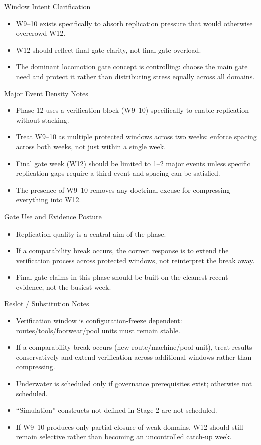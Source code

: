 \documentclass[10pt]{article}
\begin{document}
Window Intent Clarification

\begin{itemize}
\item W9–10 exists specifically to absorb replication pressure that would otherwise overcrowd W12.
\item W12 should reflect final-gate clarity, not final-gate overload.
\item The dominant locomotion gate concept is controlling: choose the main gate need and protect it rather than distributing stress equally across all domains.
\end{itemize}

Major Event Density Notes

\begin{itemize}
\item Phase 12 uses a verification block (W9–10) specifically to enable replication without stacking.
\item Treat W9–10 as multiple protected windows across two weeks: enforce spacing across both weeks, not just within a single week.
\item Final gate week (W12) should be limited to 1–2 major events unless specific replication gaps require a third event and spacing can be satisfied.
\item The presence of W9–10 removes any doctrinal excuse for compressing everything into W12.
\end{itemize}

Gate Use and Evidence Posture

\begin{itemize}
\item Replication quality is a central aim of the phase.
\item If a comparability break occurs, the correct response is to extend the verification process across protected windows, not reinterpret the break away.
\item Final gate claims in this phase should be built on the cleanest recent evidence, not the busiest week.
\end{itemize}

Reslot / Substitution Notes

\begin{itemize}
\item Verification window is configuration-freeze dependent: routes/tools/footwear/pool units must remain stable.
\item If a comparability break occurs (new route/machine/pool unit), treat results conservatively and extend verification across additional windows rather than compressing.
\item Underwater is scheduled only if governance prerequisites exist; otherwise not scheduled.
\item “Simulation” constructs not defined in Stage 2 are not scheduled.
\item If W9–10 produces only partial closure of weak domains, W12 should still remain selective rather than becoming an uncontrolled catch-up week.
\end{itemize}
\end{document}
